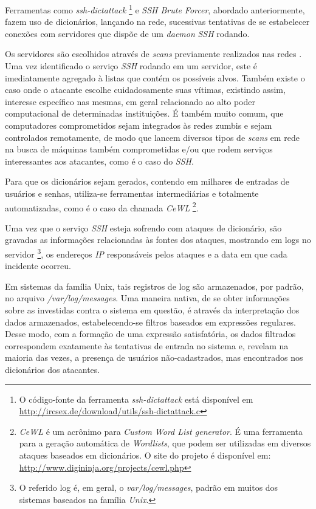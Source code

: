 Ferramentas como \textit{ssh-dictattack} \footnote{O código-fonte da ferramenta \textit{ssh-dictattack} está disponível em \url{http://ircsex.de/download/utils/ssh-dictattack.c}} e \textit{SSH Brute Forcer}, abordado anteriormente, fazem uso de dicionários, lançando na rede, sucessivas tentativas de se estabelecer conexões com servidores que dispõe de um \textit{daemon} \textit{SSH} rodando.

Os servidores são escolhidos através de \textit{scans} previamente realizados nas redes \cite{NetworkBasedDictionaryAttackDetection}. Uma vez identificado o serviço \textit{SSH} rodando em um servidor, este é imediatamente agregado à listas que contém os possíveis alvos. Também existe o caso onde o atacante escolhe cuidadosamente suas vítimas, existindo assim, interesse específico nas mesmas, em geral relacionado ao alto poder computacional de determinadas instituições. É também muito comum, que computadores comprometidos sejam integrados às redes zumbis e sejam controlados remotamente, de modo que lancem diversos tipos de \textit{scans} em rede na busca de máquinas também comprometidas e/ou que rodem serviços interessantes aos atacantes, como é o caso do \textit{SSH}.

Para que os dicionários sejam gerados, contendo em milhares de entradas de usuários e senhas, utiliza-se ferramentas intermediárias e totalmente automatizadas, como é o caso da chamada \textit{CeWL} \footnote{\textit{CeWL} é um acrônimo para \textit{Custom Word List generator}. É uma ferramenta para a geração automática de \textit{Wordlists}, que podem ser utilizadas em diversos ataques baseados em dicionários. O site do projeto é disponível em: \url{http://www.digininja.org/projects/cewl.php}}.

Uma vez que o serviço \textit{SSH} esteja sofrendo com ataques de dicionário, são gravadas as informações relacionadas às fontes dos ataques, mostrando em logs no servidor \footnote{O referido log é, em geral, o \textit{var/log/messages}, padrão em muitos dos sistemas baseados na família \textit{Unix}.}, os endereços \textit{IP} responsáveis pelos ataques e a data em que cada incidente ocorreu.

Em sistemas da família Unix, tais registros de log são armazenados, por padrão, no arquivo \textit{/var/log/messages}. Uma maneira nativa, de se obter informações sobre as investidas contra o sistema em questão, é através da interpretação dos dados armazenados, estabelecendo-se filtros baseados em expressões regulares. Desse modo, com a formação de uma expressão satisfatória, os dados filtrados correspondem exatamente às tentativas de entrada no sistema e, revelam na maioria das vezes, a presença de usuários não-cadastrados, mas encontrados nos dicionários dos atacantes.

